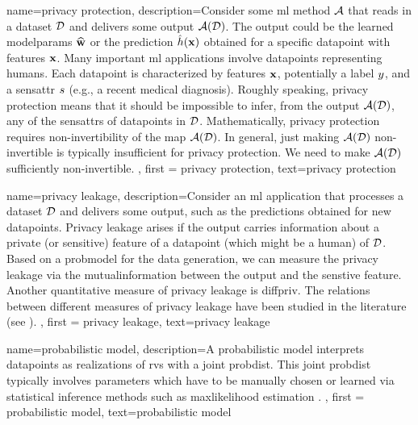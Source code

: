 {name={privacy protection},
     description={Consider some \gls{ml} method $\mathcal{A}$ that reads 
	 in a \gls{dataset} $\mathcal{D}$ and delivers some output $\mathcal{A}(\mathcal{D})$. The output 
	 could be the learned \gls{modelparams} $\widehat{{\bf w}}$ or the \gls{prediction} 
	 $\hat{h}({\bf x})$ obtained for a specific \gls{datapoint} with \gls{feature}s 
	 ${\bf x}$. Many important \gls{ml} applications involve \gls{datapoint}s 
		representing humans. Each \gls{datapoint} is characterized by \gls{feature}s ${\bf x}$, 
		potentially a \gls{label} $y$, and a \gls{sensattr} $s$ (e.g., a recent medical diagnosis). 
		Roughly speaking, privacy protection means that it should be impossible to infer, from the output $\mathcal{A}(\mathcal{D})$, 
		any of the \gls{sensattr}s of \gls{datapoint}s in $\mathcal{D}$. Mathematically, privacy protection requires non-invertibility 
		of the map $\mathcal{A}(\mathcal{D})$. In general, just making $\mathcal{A}(\mathcal{D})$ non-invertible 
		is typically insufficient for privacy protection. We need to make $\mathcal{A}(\mathcal{D})$ sufficiently non-invertible. 
	}, 
	first = {privacy protection}, text={privacy protection} 
}

{
	name=privacy leakage,
	description={Consider an \gls{ml} application that processes a 
	\gls{dataset} $\mathcal{D}$ and delivers some output, such as the \gls{prediction}s 
	obtained for new \gls{datapoint}s. Privacy leakage arises 
	if the output carries information about a private (or sensitive) \gls{feature} of 
	a \gls{datapoint} (which might be a human) of $\mathcal{D}$. Based on a \gls{probmodel} 
	for the \gls{data} generation, we can measure the privacy leakage via the \gls{mutualinformation} 
	between the output and the senstive \gls{feature}. Another quantitative measure of privacy leakage 
	is \gls{diffpriv}. The relations between different measures of privacy leakage have been 
	studied in the literature (see \cite{InfThDiffPriv}). 
	}, 
	first = {privacy leakage}, text={privacy leakage} 
}



{
	name=probabilistic model,
	description={A probabilistic \gls{model} interprets \gls{datapoint}s 
		as \gls{realization}s of \gls{rv}s with a joint \gls{probdist}. This joint \gls{probdist} typically 
		involves \gls{parameters} which have to be manually chosen or learned via statistical inference 
		methods such as \gls{maxlikelihood} estimation \cite{LC}. }, 
	first = {probabilistic model}, text={probabilistic model} 
}


